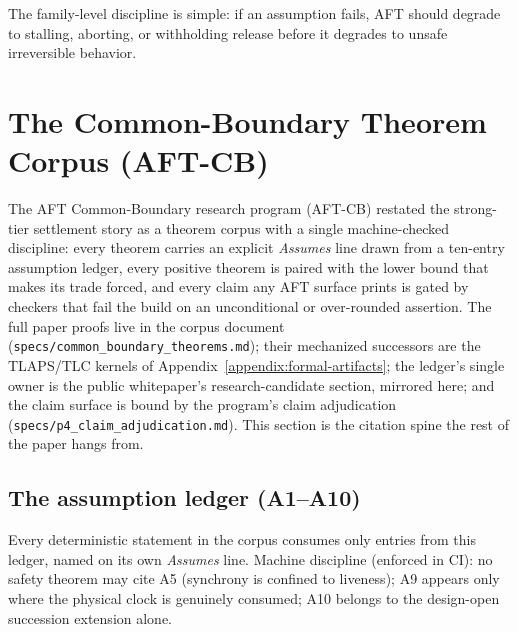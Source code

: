\documentclass[11pt]{article}
\newcommand{\AFT}{\textsc{AFT}}
\newcommand{\code}[1]{\texttt{#1}}
\newcommand{\term}[1]{\textit{#1}}
\begin{document}
The family-level discipline is simple: if an assumption fails, \AFT{} should
degrade to stalling, aborting, or withholding release before it degrades to
unsafe irreversible behavior.

\section{The Common-Boundary Theorem Corpus (AFT-CB)}
\label{sec:aft-cb-corpus}

The AFT Common-Boundary research program (AFT-CB) restated the strong-tier
settlement story as a theorem corpus with a single machine-checked
discipline: every theorem carries an explicit \term{Assumes} line drawn
from a ten-entry assumption ledger, every positive theorem is paired with
the lower bound that makes its trade forced, and every claim any AFT
surface prints is gated by checkers that fail the build on an unconditional
or over-rounded assertion. The full paper proofs live in the corpus
document (\code{specs/common\_boundary\_theorems.md}); their mechanized
successors are the TLAPS/TLC kernels of Appendix~\ref{appendix:formal-artifacts};
the ledger's single owner is the public whitepaper's research-candidate
section, mirrored here; and the claim surface is bound by the program's
claim adjudication (\code{specs/p4\_claim\_adjudication.md}). This section
is the citation spine the rest of the paper hangs from.

\subsection{The assumption ledger (A1--A10)}
\label{sec:assumption-ledger}

Every deterministic statement in the corpus consumes only entries from
this ledger, named on its own \term{Assumes} line. Machine discipline
(enforced in CI): no safety theorem may cite A5 (synchrony is confined to
liveness); A9 appears only where the physical clock is genuinely consumed;
A10 belongs to the design-open succession extension alone.
\end{document}
